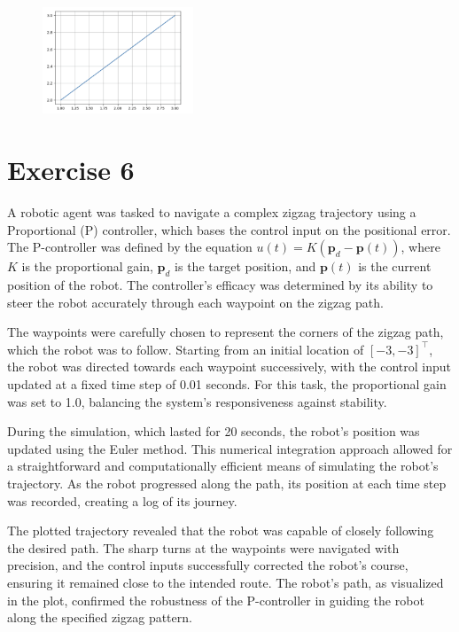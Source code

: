 \documentclass[letterpaper, 10 pt, conference]{ieeeconf}  %
\begin{document}
\begin{figure}[htbp]
    \centering
    \includegraphics[width=0.4\textwidth]{image1.png}
\end{figure}

\section{Exercise 6}

A robotic agent was tasked to navigate a complex zigzag trajectory using a Proportional (P) controller, which bases the control input on the positional error. The P-controller was defined by the equation \( u(t) = K (\mathbf{p}_d - \mathbf{p}(t)) \), where \( K \) is the proportional gain, \( \mathbf{p}_d \) is the target position, and \( \mathbf{p}(t) \) is the current position of the robot. The controller's efficacy was determined by its ability to steer the robot accurately through each waypoint on the zigzag path.

The waypoints were carefully chosen to represent the corners of the zigzag path, which the robot was to follow. Starting from an initial location of \( [-3, -3]^\top \), the robot was directed towards each waypoint successively, with the control input updated at a fixed time step of 0.01 seconds. For this task, the proportional gain was set to 1.0, balancing the system's responsiveness against stability.

During the simulation, which lasted for 20 seconds, the robot's position was updated using the Euler method. This numerical integration approach allowed for a straightforward and computationally efficient means of simulating the robot's trajectory. As the robot progressed along the path, its position at each time step was recorded, creating a log of its journey.

The plotted trajectory revealed that the robot was capable of closely following the desired path. The sharp turns at the waypoints were navigated with precision, and the control inputs successfully corrected the robot's course, ensuring it remained close to the intended route. The robot's path, as visualized in the plot, confirmed the robustness of the P-controller in guiding the robot along the specified zigzag pattern.
\end{document}
